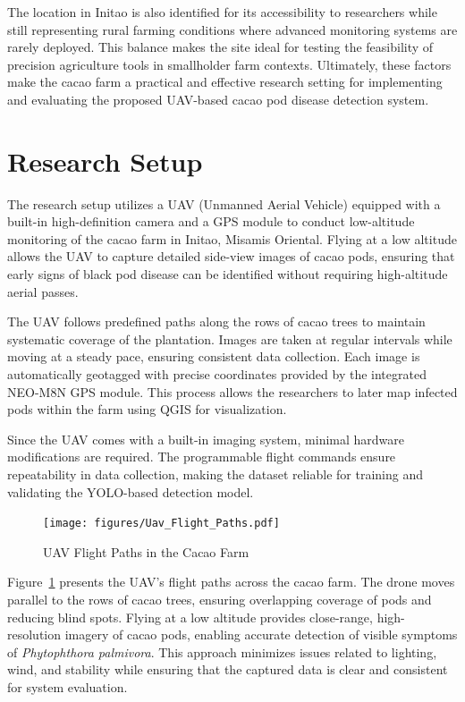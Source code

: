 The location in Initao is also identified for its accessibility to researchers while still representing rural farming conditions where advanced monitoring systems are rarely deployed. 
This balance makes the site ideal for testing the feasibility of precision agriculture tools in smallholder farm contexts. 
Ultimately, these factors make the cacao farm a practical and effective research setting for implementing and evaluating the proposed UAV-based cacao pod disease detection system.



\section{Research Setup}

The research setup utilizes a UAV (Unmanned Aerial Vehicle) equipped with a built-in high-definition camera and a GPS module to conduct low-altitude monitoring of the cacao farm in Initao, Misamis Oriental. 
Flying at a low altitude allows the UAV to capture detailed side-view images of cacao pods, ensuring that early signs of black pod disease can be identified without requiring high-altitude aerial passes.

The UAV follows predefined paths along the rows of cacao trees to maintain systematic coverage of the plantation. 
Images are taken at regular intervals while moving at a steady pace, ensuring consistent data collection. 
Each image is automatically geotagged with precise coordinates provided by the integrated NEO-M8N GPS module. 
This process allows the researchers to later map infected pods within the farm using QGIS for visualization.

Since the UAV comes with a built-in imaging system, minimal hardware modifications are required. 
The programmable flight commands ensure repeatability in data collection, making the dataset reliable for training and validating the YOLO-based detection model.

\begin{figure}[H]
	\centering
	\caption{UAV Flight Paths in the Cacao Farm}
	\label{fig:uav_flight_paths}
	\texttt{[image: figures/Uav\_Flight\_Paths.pdf]}
\end{figure}

Figure~\ref{fig:uav_flight_paths} presents the UAV’s flight paths across the cacao farm. 
The drone moves parallel to the rows of cacao trees, ensuring overlapping coverage of pods and reducing blind spots. 
Flying at a low altitude provides close-range, high-resolution imagery of cacao pods, enabling accurate detection of visible symptoms of \textit{Phytophthora palmivora}. 
This approach minimizes issues related to lighting, wind, and stability while ensuring that the captured data is clear and consistent for system evaluation.


